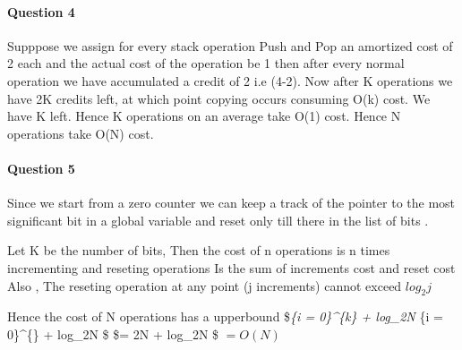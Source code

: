\documentclass[11pt]{article}
\begin{document}
    \paragraph{Question 4}\label{question-4}

Supppose we assign for every stack operation Push and Pop an amortized
cost of 2 each and the actual cost of the operation be 1 then after
every normal operation we have accumulated a credit of 2 i.e (4-2). Now
after K operations we have 2K credits left, at which point copying
occurs consuming O(k) cost. We have K left. Hence K operations on an
average take O(1) cost. Hence N operations take O(N) cost.

    \paragraph{Question 5}\label{question-5}

Since we start from a zero counter we can keep a track of the pointer to
the most significant bit in a global variable and reset only till there
in the list of bits .

Let K be the number of bits, Then the cost of n operations is n times
incrementing and reseting operations Is the sum of increments cost and
reset cost Also , The reseting operation at any point (j increments)
cannot exceed \(log_2j\)

Hence the cost of N operations has a upperbound \$\le \Sigma\emph{\{i =
0\}\^{}\{k\}  + log\_2N \le \Sigma}\{i = 0\}\^{}\{\infty\}
 + log\_2N \$ \$= 2N + log\_2N \$ \(= O(N)\)
\end{document}
